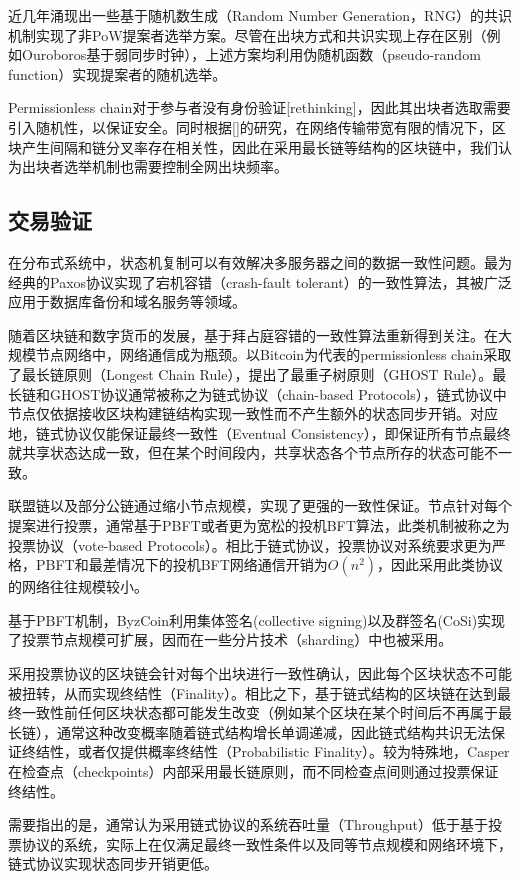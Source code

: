 近几年涌现出一些基于随机数生成（Random Number Generation，RNG）的共识机制实现了非PoW提案者选举方案\cite{gilad2017algorand,david2018ouroboros,hanke2018difinity}。尽管在出块方式和共识实现上存在区别（例如Ouroboros基于弱同步时钟），上述方案均利用伪随机函数（pseudo-random function）实现提案者的随机选举。

Permissionless chain对于参与者没有身份验证[rethinking]，因此其出块者选取需要引入随机性，以保证安全。同时根据[]的研究，在网络传输带宽有限的情况下，区块产生间隔和链分叉率存在相关性，因此在采用最长链等结构的区块链中，我们认为出块者选举机制也需要控制全网出块频率。

\subsection{交易验证}
在分布式系统中，状态机复制可以有效解决多服务器之间的数据一致性问题\cite{schneider1990implementing}。最为经典的Paxos协议实现了宕机容错（crash-fault tolerant）的一致性算法\cite{lamport2001paxos}，其被广泛应用于数据库备份和域名服务等领域\cite{burrows2006chubby,chang2008bigtable}。

随着区块链和数字货币的发展，基于拜占庭容错的一致性算法重新得到关注。在大规模节点网络中，网络通信成为瓶颈。以Bitcoin为代表的permissionless chain采取了最长链原则（Longest Chain Rule）\cite{nakamoto2008bitcoin}，\cite{sompolinsky2015secure}提出了最重子树原则（GHOST Rule）。最长链和GHOST协议通常被称之为链式协议（chain-based Protocols），链式协议中节点仅依据接收区块构建链结构实现一致性而不产生额外的状态同步开销。对应地，链式协议仅能保证最终一致性（Eventual Consistency），即保证所有节点最终就共享状态达成一致，但在某个时间段内，共享状态各个节点所存的状态可能不一致。

联盟链以及部分公链通过缩小节点规模，实现了更强的一致性保证。节点针对每个提案进行投票，通常基于PBFT\cite{castro1999practical}或者更为宽松的投机BFT算法\cite{kotla2007zyzzyva}，此类机制被称之为投票协议（vote-based Protocols）。相比于链式协议，投票协议对系统要求更为严格，PBFT和最差情况下的投机BFT网络通信开销为$O(n^2)$，因此采用此类协议的网络往往规模较小。

基于PBFT机制，ByzCoin\cite{kogias2016enhancing}利用集体签名(collective signing)以及群签名(CoSi)实现了投票节点规模可扩展，因而在一些分片技术（sharding）中也被采用\cite{kokoris2018omniledger}。

采用投票协议的区块链会针对每个出块进行一致性确认，因此每个区块状态不可能被扭转，从而实现终结性（Finality）。相比之下，基于链式结构的区块链在达到最终一致性前任何区块状态都可能发生改变（例如某个区块在某个时间后不再属于最长链），通常这种改变概率随着链式结构增长单调递减\cite{nakamoto2008bitcoin}，因此链式结构共识无法保证终结性，或者仅提供概率终结性（Probabilistic Finality）。较为特殊地，Casper\cite{buterin2017casper}在检查点（checkpoints）内部采用最长链原则，而不同检查点间则通过投票保证终结性。

需要指出的是，通常认为采用链式协议的系统吞吐量（Throughput）低于基于投票协议的系统，实际上在仅满足最终一致性条件以及同等节点规模和网络环境下，链式协议实现状态同步开销更低。








